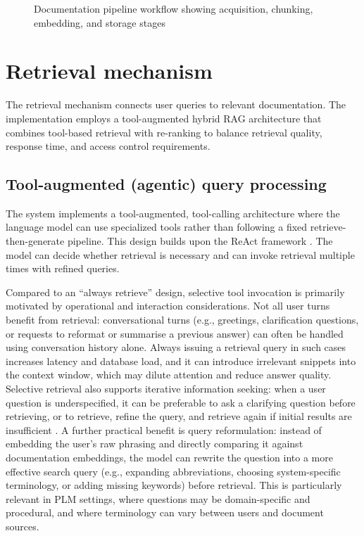 \begin{figure}[htbp]
    \centering
    \small{\resizebox{0.75\textwidth}{!}{}}
    \caption{Documentation pipeline workflow showing acquisition, chunking, embedding, and storage stages}
    \label{fig:documentation-pipeline}
\end{figure}

\section{Retrieval mechanism}
\label{sec:retrieval-mechanism}

The retrieval mechanism connects user queries to relevant documentation. The implementation employs a tool-augmented hybrid RAG architecture that combines tool-based retrieval with re-ranking to balance retrieval quality, response time, and access control requirements.

\subsection{Tool-augmented (agentic) query processing}
\label{subsec:query-processing}

The system implements a tool-augmented, tool-calling architecture where the language model can use specialized tools rather than following a fixed retrieve-then-generate pipeline. This design builds upon the ReAct framework \parencite{yaoReActSynergizingReasoning2022}. The model can decide whether retrieval is necessary and can invoke retrieval multiple times with refined queries.

Compared to an ``always retrieve'' design, selective tool invocation is primarily motivated by operational and interaction considerations. Not all user turns benefit from retrieval: conversational turns (e.g., greetings, clarification questions, or requests to reformat or summarise a previous answer) can often be handled using conversation history alone. Always issuing a retrieval query in such cases increases latency and database load, and it can introduce irrelevant snippets into the context window, which may dilute attention and reduce answer quality. Selective retrieval also supports iterative information seeking: when a user question is underspecified, it can be preferable to ask a clarifying question before retrieving, or to retrieve, refine the query, and retrieve again if initial results are insufficient \parencite{yaoReActSynergizingReasoning2022, fengRetrievalGenerationSynergyAugmented2024}. A further practical benefit is query reformulation: instead of embedding the user's raw phrasing and directly comparing it against documentation embeddings, the model can rewrite the question into a more effective search query (e.g., expanding abbreviations, choosing system-specific terminology, or adding missing keywords) before retrieval. This is particularly relevant in PLM settings, where questions may be domain-specific and procedural, and where terminology can vary between users and document sources.

